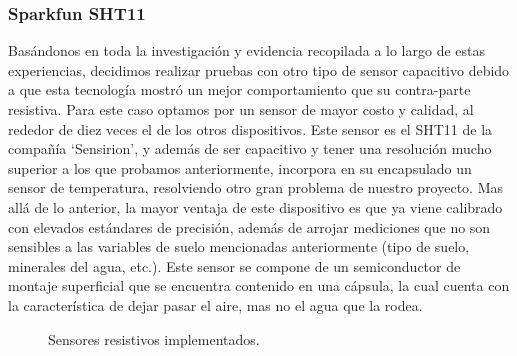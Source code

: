 \documentclass{article}
\begin{document}
\subsubsection{Sparkfun SHT11}
Basándonos en toda la investigación y evidencia recopilada a lo largo de estas experiencias, decidimos realizar pruebas con otro tipo de sensor capacitivo debido a que esta tecnología mostró un mejor comportamiento que su contra-parte resistiva. Para este caso optamos por un sensor de mayor costo y calidad, al rededor de diez veces el de los otros dispositivos.
Este sensor es el SHT11 de la compañía `Sensirion', y además de ser capacitivo y tener una resolución mucho superior a los que probamos anteriormente, incorpora en su encapsulado un sensor de temperatura, resolviendo otro gran problema de nuestro proyecto. Mas allá de lo anterior, la mayor ventaja de este dispositivo es que ya viene calibrado con elevados estándares de precisión, además de arrojar mediciones que no son sensibles a las variables de suelo mencionadas anteriormente (tipo de suelo, minerales del agua, etc.). Este sensor se compone de un semiconductor de montaje superficial que se encuentra contenido en una cápsula, la cual cuenta con la característica de dejar pasar el aire, mas no el agua que la rodea.

\begin{figure}[H]%
    \centering
    \caption{Sensores resistivos implementados.}%
    \label{fig:sht11}%
\end{figure}
\end{document}
